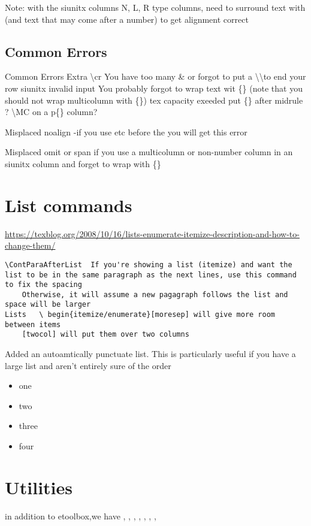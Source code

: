 \documentclass{\FormatDir corpboreportMulti}
\newcommand{\cmd}[1]{\texttt{\detokenize{#1}}}
\begin{document}
Note: with the siunitx columns N, L, R type columns, need to surround text with \cmd{{}} (and text that may come after a number) to get alignment correct

	


\subsection{Common Errors}
Common Errors
	Extra \textbackslash cr	You have too many \& or forgot to put a \textbackslash\textbackslash to end your row
	siunitx invalid input	You probably forgot to wrap text wit \{\}  (note that you should not wrap multicolumn with \{\})
	tex capacity exeeded	put \{\} after midrule ?
	\textbackslash MC on a p\{\} column?

Misplaced noalign -if you use \cmd{\midrule} etc before the \cmd{\\} you will get this error

Misplaced omit or span if you use a multicolumn or non-number column in an siunitx column and
forget to wrap with \{\}

\section{List commands}
\url{https://texblog.org/2008/10/16/lists-enumerate-itemize-description-and-how-to-change-them/}

\begin{lstlisting}
\ContParaAfterList	If you're showing a list (itemize) and want the list to be in the same paragraph as the next lines, use this command to fix the spacing
	Otherwise, it will assume a new pagagraph follows the list and space will be larger
Lists	\ begin{itemize/enumerate}[moresep] will give more room between items
	[twocol] will put them over two columns

\end{lstlisting}

	Added an autoamtically punctuate list. This is particularly useful if you have a large list and aren't entirely sure of the order

\begin{itemize}[autopunc]
	\item one
	\item two
	\item three
	\item four
\end{itemize}

	\section{Utilities}
in addition to etoolbox,we have
\cmd{\invtoggle{}}, \cmd{\gettogglestate}, \cmd{\ifdefOR{d1}{d2}{t}{f}},
\cmd{\ifstringeqx{}{}{}[]}, \cmd{\DoIfnotEmpty{}{}[]},
\cmd{\DoWithoutPrinting{}},
\cmd{\DontDo{}},
\end{document}

